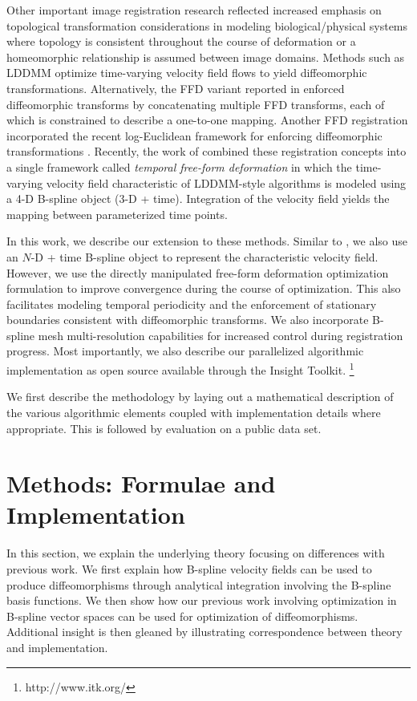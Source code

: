 \documentclass{llncs}
\begin{document}
Other important image registration research
reflected increased emphasis on topological transformation considerations
in modeling biological/physical systems where topology is 
consistent throughout the course of deformation or a 
homeomorphic relationship is assumed between image domains.
Methods such as LDDMM \cite{beg2005} optimize time-varying velocity field 
flows to yield diffeomorphic transformations.  Alternatively, the FFD 
variant reported in \cite{rueckert2006} enforced diffeomorphic transforms
by concatenating multiple FFD transforms, each of which is constrained
to describe a one-to-one mapping.  Another FFD registration
incorporated the recent log-Euclidean framework for enforcing diffeomorphic
transformations \cite{Modat2011}.
Recently, the work of 
\cite{de-craene2011} combined these registration concepts into a single
framework called {\em temporal free-form deformation} in which the 
time-varying velocity field characteristic of LDDMM-style algorithms
is modeled using a 4-D B-spline object (3-D + time).  Integration of 
the velocity field yields the mapping between parameterized time points.

In this work, we describe our extension to these methods.  Similar to 
\cite{de-craene2011}, we also use an $N$-D + time B-spline object to 
represent the characteristic velocity field.  However, we use the 
directly manipulated free-form deformation optimization formulation to improve 
convergence during the course of optimization.  This also facilitates
modeling temporal periodicity and
the enforcement of stationary boundaries consistent with diffeomorphic
transforms.
We also incorporate B-spline mesh multi-resolution capabilities
for increased control during registration progress.  
Most importantly, we also describe
our parallelized algorithmic implementation as open source available through the Insight Toolkit.%
\footnote{
http://www.itk.org/
}

We first describe the methodology by laying out a mathematical description 
of the various algorithmic elements coupled with implementation details
where appropriate.  This is followed by evaluation on a public data set. 

\section{Methods: Formulae  and Implementation}

In this section, we explain the underlying theory focusing on
differences with previous work.  We first explain how B-spline
velocity fields can be used to produce diffeomorphisms through
analytical integration involving the B-spline basis functions. 
We then show how our previous work involving optimization in 
B-spline vector spaces \cite{tustison2009} can be used for
optimization of diffeomorphisms.  Additional insight is then
gleaned by illustrating correspondence between theory and 
implementation.
\end{document}
